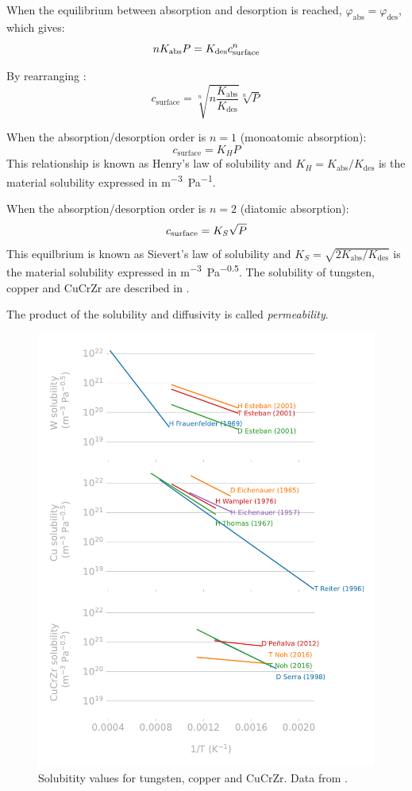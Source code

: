 When the equilibrium between absorption and desorption is reached, $\varphi_\mathrm{abs} = \varphi_\mathrm{des}$, which gives:
\begin{equation}
    n K_\mathrm{abs} P = K_\mathrm{des} c_\mathrm{surface}^n
    \labeq{equilibrium absorption desorption}
\end{equation}

By rearranging :
\begin{equation}
    c_\mathrm{surface} = \sqrt[n]{n \frac{K_\mathrm{abs}}{K_\mathrm{des}}} \sqrt[n]{P}
\end{equation}

When the absorption/desorption order is $n=1$ (monoatomic absorption):
\begin{equation}
    c_\mathrm{surface} = K_H P
\end{equation}
This relationship is known as Henry's law of solubility and $K_H = K_\mathrm{abs}/K_\mathrm{des}$ is the material solubility expressed in \si{m^{-3}.Pa^{-1}}.

When the absorption/desorption order is $n=2$ (diatomic absorption):
\begin{equation}
    c_\mathrm{surface} = K_S \sqrt{P}
    \labeq{sievert's law}
\end{equation}
This equilbrium is known as Sievert's law of solubility and $K_S = \sqrt{2 K_\mathrm{abs}/K_\mathrm{des}}$ is the material solubility expressed in \si{m^{-3}.Pa^{-0.5}}.
The solubility of tungsten, copper and CuCrZr are described in .

The product of the solubility and diffusivity is called \textit{permeability}.

\begin{figure}
    \centering
    \includegraphics[width=0.75\linewidth]{Figures/Chapter1/materials_solubility_review_comparison.pdf}
    \caption{Solubitity values for tungsten, copper and CuCrZr. Data from \cite{delaporte-mathurin_remdelaportemathurinh-transport-materials_2022}.}
\end{figure}

